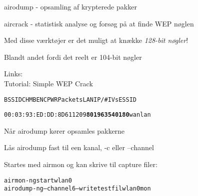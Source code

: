 \documentclass[Screen16to9,17pt]{foils}
\begin{document}


\begin{list1}
\item airodump - opsamling af krypterede pakker
\item aircrack - statistisk analyse og forsøg på at finde WEP nøglen
\item Med disse værktøjer er det muligt at knække \emph{128-bit nøgler}!
\item Blandt andet fordi det reelt er 104-bit nøgler \smiley
\item Links:\\
Tutorial: Simple WEP Crack\\
\end{list1}



\begin{alltt}
\hlktiny
   BSSID              CH  MB  ENC  PWR  Packets   LAN IP / # IVs   ESSID

   00:03:93:ED:DD:8D   6  11       209   {\bf 801963                  540180}   wanlan
\end{alltt}

\begin{list1}
\item Når airodump kører opsamles pakkerne
\item Lås airodump fast til een kanal, -c eller --channel
\end{list1}

Startes med airmon og kan skrive til capture filer:

\begin{alltt}
airmon-ng start wlan0
airodump-ng --channel 6 --write testfil wlan0mon
\end{alltt}

\end{document}
